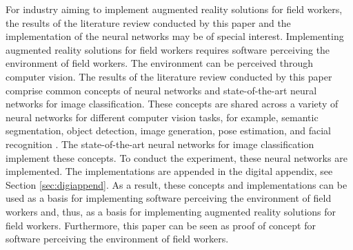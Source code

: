 For industry aiming to implement augmented reality solutions for field workers, the results of the literature review conducted by this paper and the implementation of the neural networks may be of special interest. Implementing augmented reality solutions for field workers requires software perceiving the environment of field workers. The environment can be perceived through computer vision. The results of the literature review conducted by this paper comprise common concepts of neural networks and state-of-the-art neural networks for image classification. These concepts are shared across a variety of neural networks for different computer vision tasks, for example, semantic segmentation, object detection, image generation, pose estimation, and facial recognition \autocites{Yuan.2019}{Tan.2019b}{Karras.2018}{Bulat.2020}{Yan.2019}. The state-of-the-art neural networks for image classification implement these concepts. To conduct the experiment, these neural networks are implemented. The implementations are appended in the digital appendix, see Section \ref{sec:digiappend}. As a result, these concepts and implementations can be used as a basis for implementing software perceiving the environment of field workers and, thus, as a basis for implementing augmented reality solutions for field workers. Furthermore, this paper can be seen as proof of concept for software perceiving the environment of field workers.